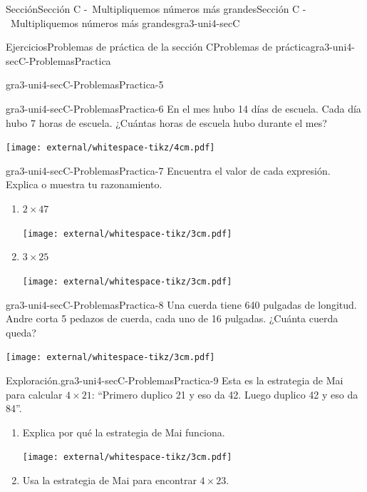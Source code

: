 \begin{sectionptx}{Sección}{Sección C -~Multipliquemos números más grandes}{}{Sección C -~Multipliquemos números más grandes}{}{}{gra3-uni4-secC}
\begin{exercises-subsection}{Ejercicios}{Problemas de práctica de la sección C}{}{Problemas de práctica}{}{}{gra3-uni4-secC-ProblemasPractica}
\begin{divisionexercise}{3}{}{}{gra3-uni4-secC-ProblemasPractica-5}
\begin{sidebyside}{2}{0.0125}{0.0125}{0.025}
\end{sidebyside}%
\end{divisionexercise}%
\begin{divisionexercise}{4}{}{}{gra3-uni4-secC-ProblemasPractica-6}%
En el mes hubo 14 días de escuela. Cada día hubo 7 horas de escuela. ¿Cuántas horas de escuela hubo durante el mes?%
\begin{image}{0}{1}{0}{}%
\texttt{[image: external/whitespace-tikz/4cm.pdf]}
\end{image}%
\end{divisionexercise}%
\begin{divisionexercise}{5}{}{}{gra3-uni4-secC-ProblemasPractica-7}%
Encuentra el valor de cada expresión. Explica o muestra tu razonamiento.%
%
\begin{enumerate}[label={(\alph*)}]
\item{}\(\displaystyle 2 \times 47\)%
\begin{image}{0}{1}{0}{}%
\texttt{[image: external/whitespace-tikz/3cm.pdf]}
\end{image}%
\item{}\(\displaystyle 3 \times 25\)%
\begin{image}{0}{1}{0}{}%
\texttt{[image: external/whitespace-tikz/3cm.pdf]}
\end{image}%
\end{enumerate}
\end{divisionexercise}%
\begin{divisionexercise}{6}{}{}{gra3-uni4-secC-ProblemasPractica-8}%
Una cuerda tiene 640 pulgadas de longitud. Andre corta 5 pedazos de cuerda, cada uno de 16 pulgadas. ¿Cuánta cuerda queda?%
\begin{image}{0}{1}{0}{}%
\texttt{[image: external/whitespace-tikz/3cm.pdf]}
\end{image}%
\end{divisionexercise}%
\clearpage
\begin{divisionexercise}{7}{Exploración.}{}{gra3-uni4-secC-ProblemasPractica-9}%
Esta es la estrategia de Mai para calcular \(4 \times 21\): “Primero duplico 21 y eso da 42. Luego duplico 42 y eso da 84”.%
%
\begin{enumerate}[label={(\alph*)}]
\item{}Explica por qué la estrategia de Mai funciona.%
\begin{image}{0}{1}{0}{}%
\texttt{[image: external/whitespace-tikz/3cm.pdf]}
\end{image}%
\item{}Usa la estrategia de Mai para encontrar \(4 \times 23\).%

\end{enumerate}
\end{divisionexercise}
\end{exercises-subsection}
\end{sectionptx}
